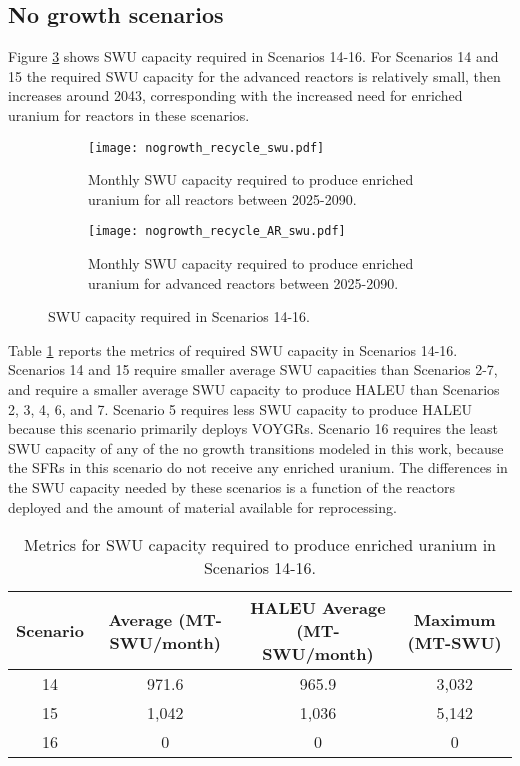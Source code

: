 \subsection{No growth scenarios}
Figure \ref{fig:nogrowth_recycle_swu} shows \gls{SWU} capacity required 
in Scenarios 14-16. For Scenarios 14 and 15 the required \gls{SWU} 
capacity for the advanced reactors is relatively small, then increases 
around 2043, corresponding with the increased need for enriched uranium 
for reactors in these scenarios. 
\begin{figure}[h!]
    \centering
    \begin{subfigure}[b]{0.45\textwidth}
        \centering
        \texttt{[image: nogrowth\_recycle\_swu.pdf]}
        \caption{Monthly SWU capacity required to produce 
        enriched uranium for all reactors between 2025-2090.}
        \label{fig:nogrowth_recycle_swu_all}
    \end{subfigure}
    \hfill
    \begin{subfigure}[b]{0.45\textwidth}
        \centering
        \texttt{[image: nogrowth\_recycle\_AR\_swu.pdf]}
        \caption{Monthly SWU capacity required to produce 
        enriched uranium for advanced reactors between 2025-2090.}
        \label{fig:nogrowth_recycle_swu_AR}
    \end{subfigure}
       \caption{\gls{SWU} capacity required in Scenarios 14-16.}
       \label{fig:nogrowth_recycle_swu}
\end{figure}

Table \ref{tab:s14-16_swu} reports the metrics of required \gls{SWU} 
capacity in Scenarios 14-16. Scenarios 14 and 15 require smaller 
average \gls{SWU} capacities than Scenarios 2-7, and require a 
smaller average \gls{SWU} capacity to produce \gls{HALEU} than 
Scenarios 2, 3, 4, 6, and 7. Scenario 5 requires less \gls{SWU} 
capacity to produce \gls{HALEU} because this scenario 
primarily deploys VOYGRs. Scenario 16 requires the least 
\gls{SWU} capacity of any of the no growth transitions 
modeled in this work, because the \glspl{SFR} in this scenario
do not receive any enriched uranium. The differences in the 
\gls{SWU} capacity needed by these scenarios is a function of 
the reactors deployed and the amount of material available for 
reprocessing.

\begin{table}[h!]
    \centering 
    \caption{Metrics for \gls{SWU} capacity required to produce 
    enriched uranium in Scenarios 14-16.}
    \label{tab:s14-16_swu}
    \begin{tabular}{c c c c}
        \hline 
        Scenario & Average (MT-SWU/month) & HALEU Average (MT-SWU/month)
         & Maximum (MT-SWU) \\
        \hline 
        14 & 971.6 & 965.9 & 3,032 \\
        15 & 1,042 & 1,036 & 5,142 \\
        16 & 0 & 0 & 0 \\
        \hline
        
    \end{tabular}
\end{table}

